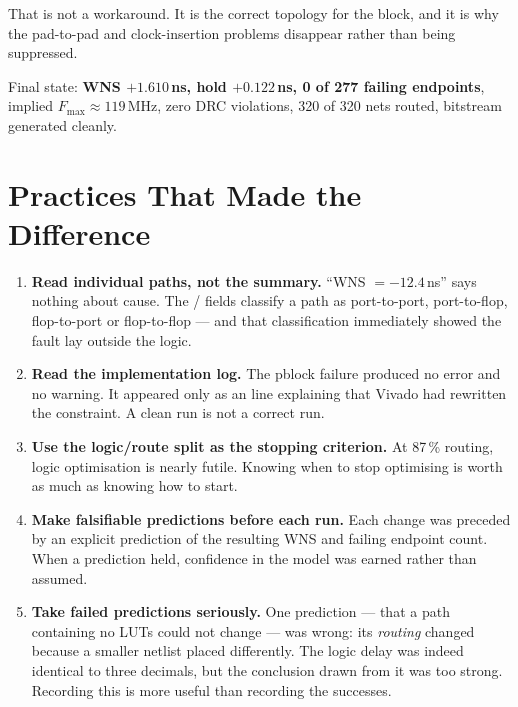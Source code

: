 \documentclass[11pt,a4paper]{article}
\newcommand{\sig}[1]{\texttt{\detokenize{#1}}}
\begin{document}
That is not a workaround. It is the correct topology for the block, and it is
why the pad-to-pad and clock-insertion problems disappear rather than being
suppressed.

Final state: \textbf{WNS $+1.610$\,ns, hold $+0.122$\,ns, 0 of 277 failing
endpoints}, implied $F_{\max}\approx119$\,MHz, zero DRC violations, 320 of 320
nets routed, bitstream generated cleanly.

\section{Practices That Made the Difference}

\begin{enumerate}[leftmargin=1.6em,itemsep=5pt]

\item \textbf{Read individual paths, not the summary.} ``WNS $=-12.4$\,ns''
      says nothing about cause. The \sig{Source}/\sig{Destination} fields
      classify a path as port-to-port, port-to-flop, flop-to-port or
      flop-to-flop --- and that classification immediately showed the fault lay
      outside the logic.

\item \textbf{Read the implementation log.} The pblock failure produced no
      error and no warning. It appeared only as an \sig{INFO} line explaining
      that Vivado had rewritten the constraint. A clean run is not a correct
      run.

\item \textbf{Use the logic/route split as the stopping criterion.} At 87\,\%
      routing, logic optimisation is nearly futile. Knowing when to stop
      optimising is worth as much as knowing how to start.

\item \textbf{Make falsifiable predictions before each run.} Each change was
      preceded by an explicit prediction of the resulting WNS and failing
      endpoint count. When a prediction held, confidence in the model was
      earned rather than assumed.

\item \textbf{Take failed predictions seriously.} One prediction --- that a
      path containing no LUTs could not change --- was wrong: its \emph{routing}
      changed because a smaller netlist placed differently. The logic delay was
      indeed identical to three decimals, but the conclusion drawn from it was
      too strong. Recording this is more useful than recording the successes.


\end{enumerate}
\end{document}
